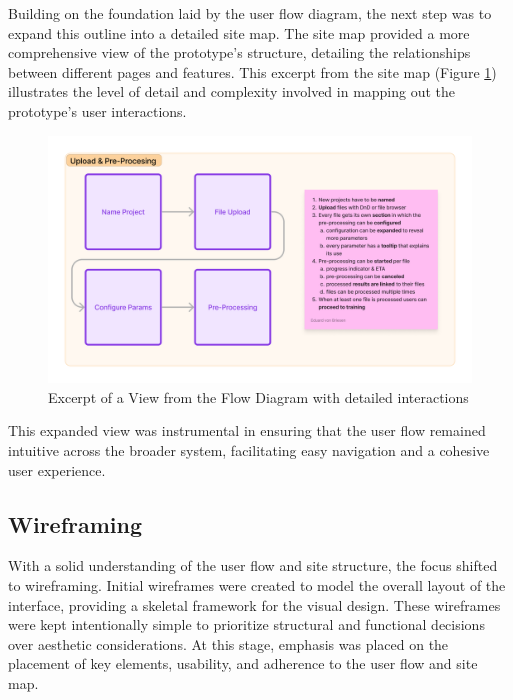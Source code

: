 Building on the foundation laid by the user flow diagram, the next step was to expand this outline into a detailed site map. 
The site map provided a more comprehensive view of the prototype's structure, detailing the relationships between different pages and features. 
This excerpt from the site map (Figure \ref{fig:design:flow-2}) illustrates the level of detail and complexity involved in mapping out the prototype's user interactions.

\begin{figure}[htb]
  \includegraphics[width=\textwidth]{figures/flow-2.png}
  \caption{Excerpt of a View from the Flow Diagram with detailed interactions}
  \label{fig:design:flow-2}
\end{figure}

This expanded view was instrumental in ensuring that the user flow remained intuitive across the broader system, facilitating easy navigation and a cohesive user experience.

\subsection*{Wireframing}

With a solid understanding of the user flow and site structure, the focus shifted to wireframing. 
Initial wireframes were created to model the overall layout of the interface, providing a skeletal framework for the visual design. 
These wireframes were kept intentionally simple to prioritize structural and functional decisions over aesthetic considerations.
At this stage, emphasis was placed on the placement of key elements, usability, and adherence to the user flow and site map.

